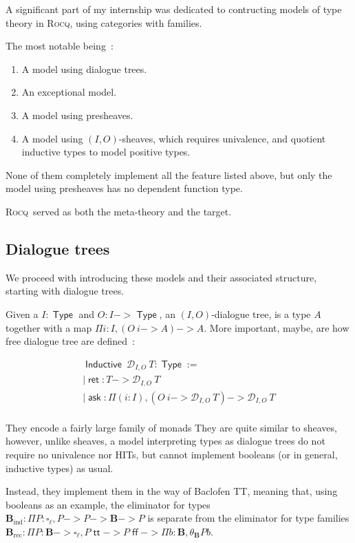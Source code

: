 \documentclass[11pt]{article}
\DeclareMathOperator{\Type}{\mathsf{Type}}
\DeclareMathOperator{\ask}{\mathsf{ask}}
\DeclareMathOperator{\Inductive}{\mathsf{Inductive}}
\DeclareMathOperator{\ret}{\mathsf{ret}}
\DeclareMathOperator{\rec}{rec}
\DeclareMathOperator{\ind}{ind}
\DeclareMathOperator{\true}{\mathsf{tt}}
\DeclareMathOperator{\false}{\mathsf{ff}}
\newcommand{\0}{\mathbf{0}}
\newcommand{\1}{\mathbf{1}}
\newcommand{\bool}{\mathbf{B}}
\newcommand{\rocq}{\textsc{Rocq}}
\begin{document}
A significant part of my internship was dedicated to contructing models of type theory in \rocq, using categories with families.

The most notable being~:
\begin{enumerate}
    \item A model using dialogue trees.
    \item An exceptional model.
    \item A model using presheaves.
    \item A model using $(I,O)$-sheaves, which requires univalence, and quotient inductive types to model positive types.
\end{enumerate}

None of them completely implement all the feature listed above, but only the model using presheaves has no dependent function type.

\rocq\ served as both the meta-theory and the target.

\subsection{Dialogue trees}

We proceed with introducing these models and their associated structure, starting with dialogue trees.

Given a $I : \Type$ and $O : I -> \Type$, an $(I,O)$-dialogue tree, is a type $A$ together with a map $\Pi i : I, (O\ i-> A) -> A$. More important, maybe, are how free dialogue tree are defined~: 

$$
\begin{array}{l}
    \Inductive\ \mathcal{D}_{I,O}\ T : \Type := \\
    \mid \ret : T -> \mathcal{D}_{I,O}\ T\\
    \mid \ask : \Pi (i : I),(O\ i -> \mathcal{D}_{I,O}\ T) -> \mathcal{D}_{I,O}\ T\\
\end{array}
$$

They encode a fairly large family of monads%
They are quite similar to sheaves, however, unlike sheaves, a model interpreting types as dialogue trees do not require no univalence nor HITs, but cannot implement booleans (or in general, inductive types) as usual.

Instead, they implement them in the way of Baclofen TT, meaning that, using booleans as an example, the eliminator for types $\bool_{\ind} : \Pi P : \square_\ell, P -> P -> \bool -> P $ is separate from the eliminator for type families $\bool_{\rec} : \Pi P : \bool -> \square_\ell, P \true -> P \false -> \Pi b : \bool, \theta_\bool P b$.
\end{document}
